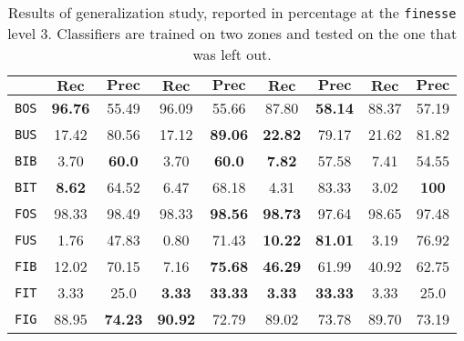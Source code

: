 \begin{table}
\begin{center}
\begin{tabular}{|c | c c | c c | c c | c c |}
                    \cline{2-9}
                    & $\bm{Rec}$ & $\bm{Prec}$ &  $\bm{Rec}$ & $\bm{Prec}$ &  $\bm{Rec}$ & $\bm{Prec}$ &  $\bm{Rec}$ & $\bm{Prec}$ \\
                    \hline
                    \texttt{BOS} & \textbf{96.76} & 55.49 & 96.09 & 55.66 & 87.80 & \textbf{58.14} & 88.37 & 57.19 \\
                    \hline
                    \texttt{BUS} & 17.42 & 80.56 & 17.12 & \textbf{89.06} & \textbf{22.82} & 79.17 & 21.62 & 81.82 \\
                    \hline
                    \texttt{BIB} & 3.70 & \textbf{60.0} & 3.70 & \textbf{60.0} & \textbf{7.82} & 57.58 & 7.41 & 54.55 \\
                    \hline
                    \texttt{BIT} & \textbf{8.62} & 64.52 & 6.47 & 68.18 & 4.31 & 83.33 & 3.02 & \textbf{100} \\
                    \hline
                    \texttt{FOS} & 98.33 & 98.49 & 98.33 & \textbf{98.56} & \textbf{98.73} & 97.64 & 98.65 & 97.48 \\
                    \hline
                    \texttt{FUS} & 1.76 & 47.83 & 0.80 & 71.43 & \textbf{10.22} & \textbf{81.01} & 3.19 & 76.92 \\
                    \hline
                    \texttt{FIB} & 12.02 & 70.15 & 7.16 & \textbf{75.68} & \textbf{46.29} & 61.99 & 40.92 & 62.75 \\
                    \hline
                    \texttt{FIT} & 3.33 & 25.0 & \textbf{3.33} & \textbf{33.33} & \textbf{3.33} & \textbf{33.33} & 3.33 & 25.0 \\
                    \hline
                    \texttt{FIG} & 88.95 & \textbf{74.23} & \textbf{90.92} & 72.79 & 89.02 & 73.78 & 89.70 & 73.19 \\
                    \hline
                \end{tabular}
                \caption{
                    \label{tab::generalization_f3}
                    Results of generalization study, reported in percentage at the \texttt{finesse} level $3$.
                Classifiers are trained on two zones and tested on the one that was left out.
                }
            \end{center}
        \end{table}

